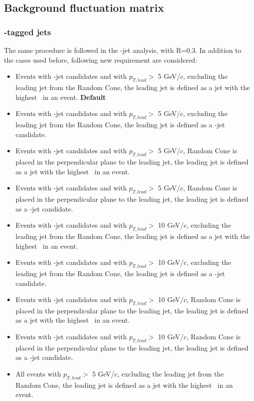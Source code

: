 \subsection{Background fluctuation matrix}
\label{sec:sysUnc_bkgFluctuations}


\subsubsection{\Dzero-tagged jets}
The same procedure is followed in the \Dzero-jet analysis, with R=0.3.
In addition to the cases used before, following new requirement are considered:
\begin{itemize}
\item Events with \Dzero-jet candidates and with $p_{T, lead}>$ 5 GeV/$c$, excluding the leading jet from the Random Cone, the leading jet is defined as a jet with the highest \pt\ in an event. \textbf{Default}
\item Events with \Dzero-jet candidates and with $p_{T, lead}>$ 5 GeV/$c$, excluding the leading jet from the Random Cone, the leading jet is defined as a \Dzero-jet candidate.
\item Events with \Dzero-jet candidates and with $p_{T, lead}>$ 5 GeV/$c$, Random Cone is placed in the perpendicular plane to the leading jet, the leading jet is defined as a jet with the highest \pt\ in an event.
\item Events with \Dzero-jet candidates and with $p_{T, lead}>$ 5 GeV/$c$, Random Cone is placed in the perpendicular plane to the leading jet, the leading jet is defined as a \Dzero-jet candidate.
\item Events with \Dzero-jet candidates and with $p_{T, lead}>$ 10 GeV/$c$, excluding the leading jet from the Random Cone, the leading jet is defined as a jet with the highest \pt\ in an event.
\item Events with \Dzero-jet candidates and with $p_{T, lead}>$ 10 GeV/$c$, excluding the leading jet from the Random Cone, the leading jet is defined as a \Dzero-jet candidate.
\item Events with \Dzero-jet candidates and with $p_{T, lead}>$ 10 GeV/$c$, Random Cone is placed in the perpendicular plane to the leading jet, the leading jet is defined as a jet with the highest \pt\ in an event.
\item Events with \Dzero-jet candidates and with $p_{T, lead}>$ 10 GeV/$c$, Random Cone is placed in the perpendicular plane to the leading jet, the leading jet is defined as a \Dzero-jet candidate.
\item All events with $p_{T, lead}>$ 5 GeV/$c$, excluding the leading jet from the Random Cone, the leading jet is defined as a jet with the highest \pt\ in an event. 

\end{itemize}
